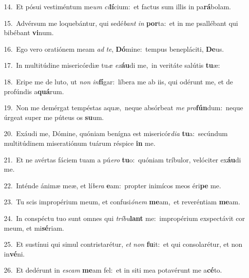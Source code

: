 {\numbfont\textcolor{\numbcolor}{14.}}~Et pósui vestiméntum me\textit{um} \textit{ci}\-\textbf{lí}cium:~\star et factus sum illis in pa\-\textbf{rá}\-bolam.\par
{\numbfont\textcolor{\numbcolor}{15.}}~Advérsum me loquebántur, qui sedé\textit{bant} \textit{in} \textbf{por}\-ta:~\star et in me psallébant qui bibébant \textbf{vi}\-num.\par
{\numbfont\textcolor{\numbcolor}{16.}}~Ego vero oratiónem meam \textit{ad} \textit{te}\-, \textbf{Dó}\-mine:~\star tempus benepláciti, \textbf{De}\-us.\par
{\numbfont\textcolor{\numbcolor}{17.}}~In multitúdine misericórdiæ tu\textit{æ} \textit{ex}\-\textbf{áu}di me,~\star in veritáte salútis \textbf{tu}\-æ:\par
{\numbfont\textcolor{\numbcolor}{18.}}~Eripe me de luto, ut \textit{non} \textit{in}\-\textbf{fí}gar:~\star líbera me ab iis, qui odérunt me, et de profúndis a\-\textbf{quá}\-rum.\par
{\numbfont\textcolor{\numbcolor}{19.}}~Non me demérgat tempéstas aquæ,~\dagger neque absórbeat \textit{me} \textit{pro}\-\textbf{fún}dum:~\star neque úrgeat super me púteus os \textbf{su}\-um.\par
{\numbfont\textcolor{\numbcolor}{20.}}~Exáudi me, Dómine, quóniam benígna est misericór\-\textit{di}\-\textit{a} \textbf{tu}\-a:~\star secúndum multitúdinem miseratiónum tuárum réspice \textbf{in} me.\par
{\numbfont\textcolor{\numbcolor}{21.}}~Et ne avértas fáciem tuam a pú\-\textit{e}\-\textit{ro} \textbf{tu}\-o:~\star quóniam tríbulor, velóciter ex\-\textbf{áu}\-di me.\par
{\numbfont\textcolor{\numbcolor}{22.}}~Inténde ánimæ meæ, et lí\-\textit{be}\-\textit{ra} \textbf{e}\-am:~\star propter inimícos meos éri\textbf{pe} me.\par
{\numbfont\textcolor{\numbcolor}{23.}}~Tu scis impropérium meum, et confusi\-\textit{ó}\-\textit{nem} \textbf{me}\-am,~\star et reveréntiam \textbf{me}\-am.\par
{\numbfont\textcolor{\numbcolor}{24.}}~In conspéctu tuo sunt omnes qui \textit{trí}\-\textit{bu}\textbf{lant} me:~\star impropérium exspectávit cor meum, et mi\-\textbf{sé}\-riam.\par
{\numbfont\textcolor{\numbcolor}{25.}}~Et sustínui qui simul contristarétur, \textit{et} \textit{non} \textbf{fu}\-it:~\star et qui consolarétur, et non in\-\textbf{vé}\-ni.\par
{\numbfont\textcolor{\numbcolor}{26.}}~Et dedérunt in \textit{es}\-\textit{cam} \textbf{me}\-am fel:~\star et in siti mea potavérunt me a\-\textbf{cé}\-to.\par
